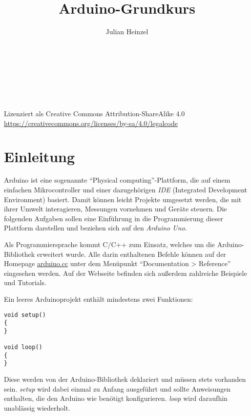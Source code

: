 \documentclass[10pt,a4paper]{article}
\title{Arduino-Grundkurs}
\author{Julian Heinzel}
\begin{document}
\begin{center}
	\makeatletter
	{\LARGE\textbf{\@title}}\\\bigskip
	{\Large\@author}\\\medskip
	{\large\@date}\\
	\makeatother
	\vspace{0.3cm}
	\\\medskip
	Lizenziert als Creative Commons Attribution-ShareAlike 4.0\\
	\url{https://creativecommons.org/licenses/by-sa/4.0/legalcode}
	\\\medskip
	{\huge\ccbysa}
\end{center}
\vspace{0.3cm}
\tableofcontents
\vspace{1cm}





\section{Einleitung}
Arduino ist eine sogenannte "`Physical computing"'-Plattform, die auf einem einfachen Mikrocontroller und einer dazugehörigen \emph{IDE} (Integrated Development Environment) basiert. Damit können leicht Projekte umgesetzt werden, die mit ihrer Umwelt interagieren, Messungen vornehmen und Geräte steuern. Die folgenden Aufgaben sollen eine Einführung in die Programmierung dieser Plattform darstellen und beziehen sich auf den \emph{Arduino Uno}.
\bigskip

Als Programmiersprache kommt C/C++ zum Einsatz, welches um die Arduino-Bibliothek erweitert wurde. Alle darin enthaltenen Befehle können auf der Homepage \href{https://www.arduino.cc/reference/de/}{arduino.cc} unter dem Menüpunkt "`Documentation > Reference"' eingesehen werden. Auf der Webseite befinden sich außerdem zahlreiche Beispiele und Tutorials.
\bigskip

Ein leeres Arduinoprojekt enthält mindestens zwei Funktionen:
\begin{lstlisting}[style=multiline]
void setup()
{
}

void loop()
{
}
\end{lstlisting}

Diese werden von der Arduino-Bibliothek deklariert und müssen stets vorhanden sein. \emph{setup} wird dabei einmal zu Anfang ausgeführt und sollte Anweisungen enthalten, die den Arduino wie benötigt konfigurieren.
\emph{loop} wird daraufhin unablässig wiederholt.
\end{document}
